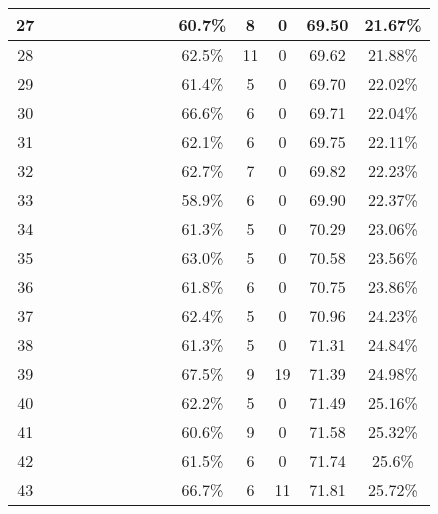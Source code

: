 \begin{longtable}{|c|c|c|c|c|c|c|c|c|c|c|c|c|c|}
27 &  \x    & \x    & \x    & \x    &       & \x\m  &       &       & 60.7\% &  8  & 0  & 69.50 & 21.67\% \\ \hline
28 &  \x    & \x    & \x    & \x    & \x    &       &       &       & 62.5\% &  11 & 0  & 69.62 & 21.88\% \\ \hline
29 &  \x    & \x    & \x    & \x    &       & \x    & \x    &       & 61.4\% &  5  & 0  & 69.70 & 22.02\% \\ \hline
30 &  \x    & \x    & \x    & \x    & \x\m  &       &       & \x    & 66.6\% &  6  & 0  & 69.71 & 22.04\% \\ \hline
31 &  \x    & \x    & \x    &       & \x    &       &       & \x    & 62.1\% &  6  & 0  & 69.75 & 22.11\% \\ \hline
32 &  \x    & \x    & \x    & \x    & \x    &       & \x    &       & 62.7\% &  7  & 0  & 69.82 & 22.23\% \\ \hline
33 &  \x    & \x    & \x    &       &       &       &       &       & 58.9\% &  6  & 0  & 69.90 & 22.37\% \\ \hline
34 &  \x    & \x    & \x    & \x    &       & \x\m  & \x    &       & 61.3\% &  5  & 0  & 70.29 & 23.06\% \\ \hline
35 &  \x    & \x    & \x    &       & \x    & \x    & \x    &       & 63.0\% &  5  & 0  & 70.58 & 23.56\% \\ \hline
36 &  \x    & \x    & \x    & \x    & \x    & \x    &       & \x    & 61.8\% &  6  & 0  & 70.75 & 23.86\% \\ \hline
37 &  \x    & \x    & \x    &       & \x    & \x    &       & \x\m  & 62.4\% &  5  & 0  & 70.96 & 24.23\% \\ \hline
38 &  \x    & \x    & \x    & \x    &       &       &       &       & 61.3\% &  5  & 0  & 71.31 & 24.84\% \\ \hline
39 &  \x    & \x    &       & \x    & \x\m  & \x\m  &       &       & 67.5\% &  9  & 19 & 71.39 & 24.98\% \\ \hline
40 &  \x    & \x    & \x    &       & \x    & \x    &       &       & 62.2\% &  5  & 0  & 71.49 & 25.16\% \\ \hline
41 &  \x    & \x    & \x    & \x    &       &       &       &       & 60.6\% &  9  & 0  & 71.58 & 25.32\% \\ \hline
42 &  \x    & \x    & \x    & \x    &       & \x    &       & \x\m  & 61.5\% &  6  & 0  & 71.74 & 25.6\% \\ \hline
43 &  \x    & \x    & \x    &       & \x\m  &       & \x\m  &       & 66.7\% &  6  & 11 & 71.81 & 25.72\% \\ \hline

\end{longtable}
